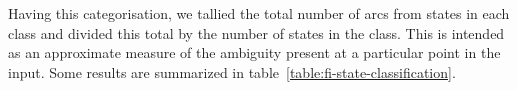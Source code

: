\documentclass[11pt]{article}
\begin{document}
Having this categorisation, we tallied the total number of arcs from states in
each class and divided this total by the number of states in the class. This
is intended as an approximate measure of the ambiguity present at a particular
point in the input. Some results are summarized in
table~\ref{table:fi-state-classification}.

\end{document}
